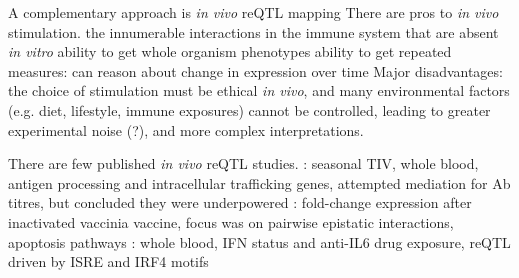\begin{outline}

\1 A complementary approach is \textit{in vivo} \gls{reQTL} mapping
    \2 There are pros to \textit{in vivo} stimulation.
        \3 the innumerable interactions in the immune system that are absent \textit{in vitro}
        \3 ability to get whole organism phenotypes
        \3 ability to get repeated measures: can reason about change in expression over time
    \2 Major disadvantages: 
        \3 the choice of stimulation must be ethical \textit{in vivo}, 
        \3 and many environmental factors (e.g. diet, lifestyle, immune exposures) cannot be controlled, leading to greater experimental noise (?), and more complex interpretations.

    \2 There are few published \textit{in vivo} \gls{reQTL} studies.
        \3 \autocite{franco2013IntegrativeGenomicAnalysis}: seasonal \gls{TIV}, whole blood, antigen processing and intracellular trafficking genes, attempted mediation for Ab titres, but concluded they were underpowered
        \3 \autocite{lareau2016InteractionQuantitativeTrait}: fold-change expression after inactivated vaccinia vaccine, focus was on pairwise epistatic interactions, apoptosis pathways
        \3 \autocite{davenport2018DiscoveringVivoCytokineeQTL}: whole blood, IFN status and anti-IL6 drug exposure, reQTL driven by ISRE and IRF4 motifs


\end{outline}
